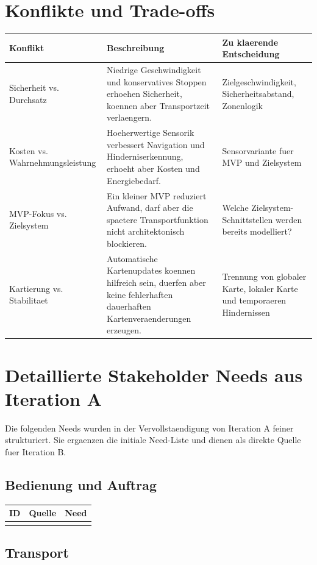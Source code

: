 \section{Konflikte und Trade-offs}

\begin{longtable}{L{0.20\textwidth} L{0.32\textwidth} L{0.34\textwidth}}
\toprule
Konflikt & Beschreibung & Zu klaerende Entscheidung \\
\midrule
Sicherheit vs. Durchsatz & Niedrige Geschwindigkeit und konservatives Stoppen erhoehen Sicherheit, koennen aber Transportzeit verlaengern. & Zielgeschwindigkeit, Sicherheitsabstand, Zonenlogik \\
Kosten vs. Wahrnehmungsleistung & Hoeherwertige Sensorik verbessert Navigation und Hinderniserkennung, erhoeht aber Kosten und Energiebedarf. & Sensorvariante fuer MVP und Zielsystem \\
MVP-Fokus vs. Zielsystem & Ein kleiner MVP reduziert Aufwand, darf aber die spaetere Transportfunktion nicht architektonisch blockieren. & Welche Zielsystem-Schnittstellen werden bereits modelliert? \\
Kartierung vs. Stabilitaet & Automatische Kartenupdates koennen hilfreich sein, duerfen aber keine fehlerhaften dauerhaften Kartenveraenderungen erzeugen. & Trennung von globaler Karte, lokaler Karte und temporaeren Hindernissen \\
\bottomrule
\end{longtable}

\section{Detaillierte Stakeholder Needs aus Iteration A}

Die folgenden Needs wurden in der Vervollstaendigung von Iteration A feiner strukturiert. Sie ergaenzen die initiale Need-Liste und dienen als direkte Quelle fuer Iteration B.

\subsection{Bedienung und Auftrag}

\begin{longtable}{L{0.18\textwidth} L{0.16\textwidth} L{0.50\textwidth}}
\toprule
ID & Quelle & Need \\
\midrule
{}
\bottomrule
\end{longtable}

\subsection{Transport}


